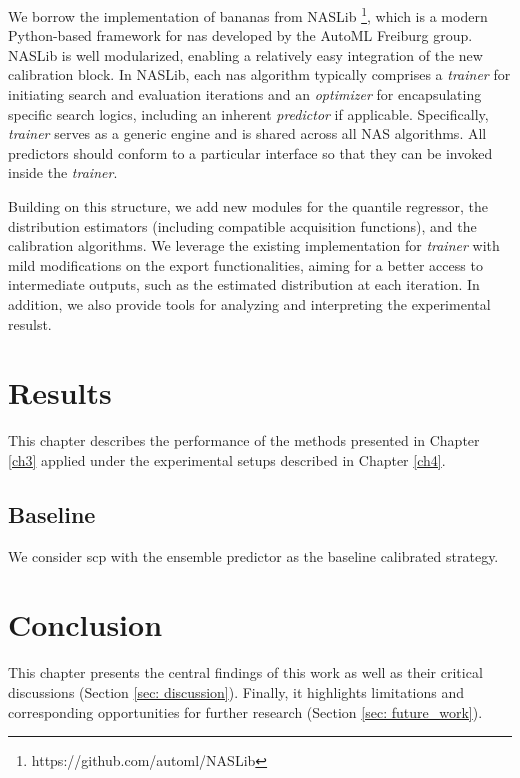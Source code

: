 \documentclass[a4paper,oneside,bibliography=totoc]{scrbook}
\begin{document}
\vspace{0.2em}
We borrow the implementation of \gls{bananas} from NASLib \footnote{https://github.com/automl/NASLib}, which is a modern Python-based framework for \gls{nas} developed by the AutoML Freiburg group. NASLib is well modularized, enabling a relatively easy integration of the new calibration block. In NASLib, each \gls{nas} algorithm typically comprises a \textit{trainer} for initiating search and evaluation iterations and an \textit{optimizer} for encapsulating specific search logics, including an inherent \textit{predictor} if applicable. Specifically, \textit{trainer} serves as a generic engine and is shared across all NAS algorithms. All predictors should conform to a particular interface so that they can be invoked inside the \textit{trainer}. 

\vspace{0.2em}
Building on this structure, we add new modules for the quantile regressor, the distribution estimators (including compatible acquisition functions), and the calibration algorithms. We leverage the existing implementation for \textit{trainer} with mild modifications on the export functionalities, aiming for a better access to intermediate outputs, such as the estimated distribution at each iteration. In addition, we also provide tools for analyzing and interpreting the experimental resulst.

\chapter{Results}
This chapter describes the performance of the methods presented in Chapter \ref{ch3} applied under the experimental setups described in Chapter \ref{ch4}.

\section{Baseline}
We consider \gls{scp} with the ensemble predictor as the baseline calibrated strategy. 


\chapter{Conclusion}
This chapter presents the central findings of this work as well as their critical discussions (Section \ref{sec: discussion}). Finally, it highlights limitations and corresponding opportunities for further research (Section \ref{sec: future_work}).
\end{document}
